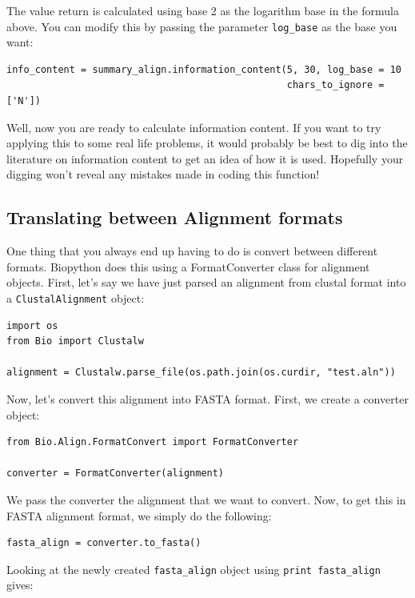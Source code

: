 \documentclass{report}
\begin{document}
The value return is calculated using base 2 as the logarithm base in the formula above. You can modify this by passing the parameter \verb|log_base| as the base you want:

\begin{verbatim}
info_content = summary_align.information_content(5, 30, log_base = 10
                                                 chars_to_ignore = ['N'])
\end{verbatim}

Well, now you are ready to calculate information content. If you want to try applying this to some real life problems, it would probably be best to dig into the literature on information content to get an idea of how it is used. Hopefully your digging won't reveal any mistakes made in coding this function!

\subsection{Translating between Alignment formats}
\label{sec:align_translate}

One thing that you always end up having to do is convert between different formats. Biopython does this using a FormatConverter class for alignment objects. First, let's say we have just parsed an alignment from clustal format into a \verb|ClustalAlignment| object:

\begin{verbatim}
import os
from Bio import Clustalw

alignment = Clustalw.parse_file(os.path.join(os.curdir, "test.aln"))
\end{verbatim}

Now, let's convert this alignment into FASTA format. First, we create a converter object:

\begin{verbatim}
from Bio.Align.FormatConvert import FormatConverter

converter = FormatConverter(alignment)
\end{verbatim}

We pass the converter the alignment that we want to convert. Now, to get this in FASTA alignment format, we simply do the following:

\begin{verbatim}
fasta_align = converter.to_fasta()
\end{verbatim}

Looking at the newly created \verb|fasta_align| object using \verb|print fasta_align| gives:
\end{document}
